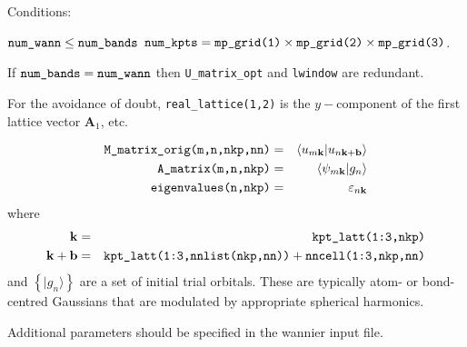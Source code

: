 Conditions:
\begin{itemize}
\cond $\verb#num_wann# \le \verb#num_bands#$
\cond $\verb#num_kpts# = \verb#mp_grid(1)# \times \verb#mp_grid(2)#
\times \verb#mp_grid(3)#$.
\end{itemize}

If $\verb#num_bands# = \verb#num_wann#$ then \verb#U_matrix_opt# and 
\verb#lwindow# are redundant. 

For the avoidance of doubt, \verb#real_lattice(1,2)# is the
$y-$component of the first lattice 
vector $\mathbf{A}_{1}$, etc.

\begin{eqnarray*}
\verb#M_matrix_orig(m,n,nkp,nn)# & = & \left\langle u_{m\mathbf{k}} |
u_{n\mathbf{k+b}}\right\rangle\\
\verb#A_matrix(m,n,nkp)# & = &
\left\langle \psi_{m\mathbf{k}}|g_{n}\right\rangle\\
\verb#eigenvalues(n,nkp)# &=& \varepsilon_{n\mathbf{k}}
\end{eqnarray*}
where
\begin{eqnarray*}
\mathbf{k} &=&\verb#kpt_latt(1:3,nkp)#\\
\mathbf{k+b}&=& \verb#kpt_latt(1:3,nnlist(nkp,nn))# +
\verb#nncell(1:3,nkp,nn)# 
\end{eqnarray*}
and
$\left\{|g_{n}\rangle\right\}$ are a set of initial trial
orbitals. These are
typically atom- or bond-centred Gaussians that are modulated by
appropriate spherical harmonics. 

Additional parameters should be specified in the wannier input
file.


